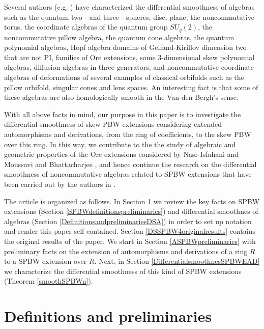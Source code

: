 \documentclass{amsart}
\theoremstyle{definition}
\theoremstyle{remark}
\numberwithin{equation}{section}
\begin{document}
Several authors (e.g. \cite{Brzezinski2015, Brzezinski2016, BrzezinskiElKaoutitLomp2010, BrzezinskiLomp2018, BrzezinskiSitarz2017, DuboisVioletteKernerMadore1990, Karacuha2015, KaracuhaLomp2014, ReyesSarmiento2022}) have characterized the differential smoothness of algebras such as the quantum two - and three - spheres, disc, plane, the noncommutative torus, the coordinate algebras of the quantum group $SU_q(2)$, the noncommutative pillow algebra, the quantum cone algebras, the quantum polynomial algebras, Hopf algebra domains of Gelfand-Kirillov dimension two that are not PI, families of Ore extensions, some 3-dimensional skew polynomial algebras, diffusion algebras in three generators, and noncommutative coordinate algebras of deformations of several examples of classical orbifolds such as the pillow orbifold, singular cones and lens spaces. An interesting fact is that some of these algebras are also homologically smooth in the Van den Bergh's sense.

With all above facts in mind, our purpose in this paper is to investigate the differential smoothness of skew PBW extensions considering extended automorphisms and derivations, from the ring of coefficients, to the skew PBW over this ring. In this way, we contribute to the the study of algebraic and geometric properties of the Ore extensions considered by Nasr-Isfahani and Moussavi \cite{NasrMoussavi2008} and Bhattacharjee \cite{Bhattacharjee2020}, and hence continue the research on the differential smoothness of noncommutative algebras related to SPBW extensions that have been carried out by the authors in \cite{ReyesSuarez2016, RubianoReyes2024DSBiquadraticAlgebras, RubianoReyes2024DSDoubleOreExtensions, RubianoReyes2024DSSPBWKt}.

The article is organized as follows. In Section \ref{DefinitionspreliminariesSPBWDS4} we review the key facts on SPBW extensions (Section \ref{SPBWdefinitionspreliminaries}) and differential smoothnes of algebras (Section \ref{DefinitionsandpreliminariesDSA}) in order to set up notation and render this paper self-contained. Section \ref{DSSPBW4originalresults} contains the original results of the paper. We start in Section \ref{ASPBWpreliminaries} with preliminary facts on the extension of automorphisms and derivations of a ring $R$ to a SPBW extension over $R$. Next, in Section \ref{DifferentialsmoothnesSPBWEAD} we characterize the differential smoothness of this kind of SPBW extensions (Theorem \ref{smoothSPBWn}). 


\section{Definitions and preliminaries}\label{DefinitionspreliminariesSPBWDS4}
\end{document}
